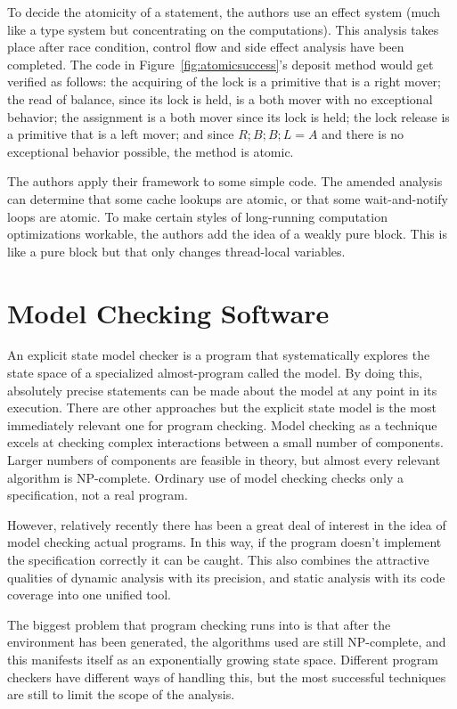 \documentclass{article}
\begin{document}
\begin{multicols}{2}
To decide the atomicity of a statement, the authors use an effect
system (much like a type system but concentrating on the
computations).  This analysis takes place after race condition,
control flow and side effect analysis have been completed.  The code
in Figure~\ref{fig:atomicsuccess}'s deposit method would get verified
as follows: the acquiring of the lock is a primitive that is a right
mover; the read of balance, since its lock is held, is a both mover
with no exceptional behavior; the assignment is a both mover since its
lock is held; the lock release is a primitive that is a left mover;
and since $R ; B ; B ; L = A$ and there is no exceptional behavior
possible, the method is atomic.

The authors apply their framework to some simple code.  The amended
analysis can determine that some cache lookups are atomic, or that
some wait-and-notify loops are atomic.  To make certain styles of
long-running computation optimizations workable, the authors add the
idea of a weakly pure block.  This is like a pure block but that only
changes thread-local variables.

\section{Model Checking Software}

An explicit state model checker is a program that systematically
explores the state space of a specialized almost-program called the
model.  By doing this, absolutely precise statements can be made about
the model at any point in its execution.  There are other approaches
but the explicit state model is the most immediately relevant one for
program checking.  Model checking as a technique excels at checking
complex interactions between a small number of components.  Larger
numbers of components are feasible in theory, but almost every
relevant algorithm is NP-complete.  Ordinary use of model checking
checks only a specification, not a real program.

However, relatively recently there has been a great deal of interest
in the idea of model checking actual programs.  In this way, if the
program doesn't implement the specification correctly it can be
caught.  This also combines the attractive qualities of dynamic
analysis with its precision, and static analysis with its code
coverage into one unified tool.

The biggest problem that program checking runs into is that after the
environment has been generated, the algorithms used are still
NP-complete, and this manifests itself as an exponentially growing
state space.  Different program checkers have different ways of
handling this, but the most successful techniques are still to limit
the scope of the analysis.


\end{multicols}
\end{document}
